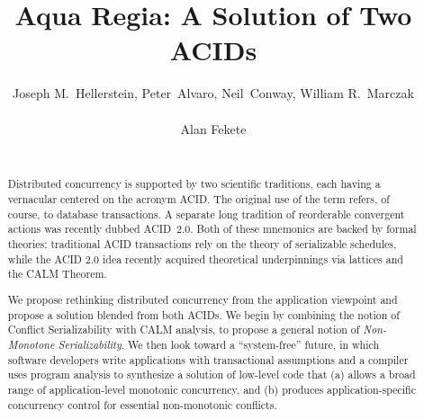 \documentclass{sig-alternate}
\begin{document}

\title{Aqua Regia: A Solution of Two ACIDs}
\author{
\alignauthor
Joseph M.~Hellerstein, Peter~Alvaro, Neil~Conway, William R.~Marczak\\
       \\
\alignauthor
Alan Fekete\\
       \\
}

\maketitle
\begin{abstract}
  Distributed concurrency is supported by two scientific traditions, each having
  a vernacular centered on the acronym \textsf{ACID}.  The original use of the
  term refers, of course, to database transactions. A separate long tradition of
  reorderable convergent actions was recently dubbed \textsf{ACID~2.0}.  Both of
  these mnemonics are backed by formal theories: traditional ACID transactions
  rely on the theory of serializable schedules, while the ACID 2.0 idea recently
  acquired theoretical underpinnings via lattices and the CALM Theorem.

  We propose rethinking distributed concurrency from the application viewpoint
  and propose a solution blended from both ACIDs.  We begin by combining the
  notion of Conflict Serializability with CALM analysis, to propose a general
  notion of \emph{Non-Monotone Serializability}.  We then look toward a
  ``system-free'' future, in which software developers write applications with
  transactional assumptions and a compiler uses program analysis to synthesize
  a solution of low-level code that (a) allows a broad range of
  application-level monotonic concurrency, and (b) produces application-specific
  concurrency control for essential non-monotonic conflicts.
\end{abstract}
\end{document}
